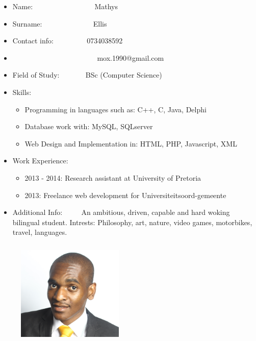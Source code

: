 \documentclass[12pt]{article}
\begin{document}
\begin{itemize}
\item Name: \ ~~~~~~~~~~~~~~ \ Mathys
\item Surname: \ ~~~~~~~~~~~ \ Ellis
\item Contact info: \ ~~~~~~ \ 0734038592
\item \ ~~~~~~~~~~~~~~~~~~~~~ \ mox.1990@gmail.com
\item Field of Study: \ ~~~~ \ BSc (Computer Science)
\item Skills: 	\begin{itemize}
					\item Programming in languages such as: C++, C, Java, Delphi
					\item Database work with: MySQL, SQLserver
					\item Web Design and Implementation in: HTML, PHP, Javascript, XML
				\end{itemize}
\item Work Experience: 	\begin{itemize}
							\item 2013 - 2014: Research assistant at University of Pretoria
							\item 2013: Freelance web development for Universiteitsoord-gemeente
						\end{itemize}
\item Additional Info: \ ~~ \ An ambitious, driven, capable and hard woking bilingual student. Intrests: Philosophy, art, nature, video games, motorbikes, travel, languages.
\end{itemize}


\newpage
\begin{figure}[ht!]
\centering
\includegraphics[width=2in, height=2in]{./Pictures/MbulungoMusetsho.jpg}
\end{figure}
\end{document}
